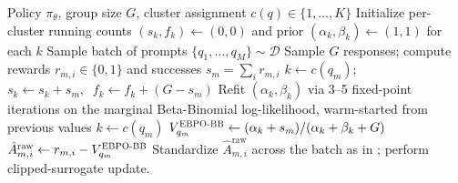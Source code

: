 \documentclass{article}
\theoremstyle{plain}
\theoremstyle{definition}
\theoremstyle{remark}
\newcommand{\oursBB}{\textsc{EBPO-BB}\xspace}
\begin{document}
\iffalse
\begin{algorithm}[tb]
   \caption{EBPO Advantage Estimation (Beta-Binomial Variant)}
   \label{alg:EBPO_BB}
\begin{algorithmic}[1]
    Policy $\pi_\theta$, group size $G$, cluster assignment $c(q)\in\{1,\dots,K\}$
   \STATE Initialize per-cluster running counts $(s_k, f_k)\gets(0,0)$ and prior $(\alpha_k,\beta_k)\gets(1,1)$ for each $k$
       \STATE Sample batch of prompts $\{q_1,\dots,q_M\}\sim\mathcal{D}$
           \STATE Sample $G$ responses; compute rewards $r_{m,i}\in\{0,1\}$ and successes $s_m=\sum_i r_{m,i}$
           \STATE $k \gets c(q_m)$;\quad $s_k \gets s_k + s_m,\;\; f_k \gets f_k + (G - s_m)$
       \ENDFOR
           \STATE Refit $(\alpha_k,\beta_k)$ via 3--5 fixed-point iterations on the marginal Beta-Binomial log-likelihood, warm-started from previous values \citep{minka2000beta}
       \ENDFOR
           \STATE $k \gets c(q_m)$
           \STATE $V_{q_m}^{\oursBB} \gets (\alpha_k + s_m) / (\alpha_k + \beta_k + G)$ 
               \STATE $\hat{A}_{m,i}^{\text{raw}} \gets r_{m,i} - V_{q_m}^{\oursBB}$
           \ENDFOR
       \ENDFOR
       \STATE Standardize $\hat{A}_{m,i}^{\text{raw}}$ across the batch as in ; perform clipped-surrogate update.
   \ENDFOR
\end{algorithmic}
\end{algorithm}
\end{document}
